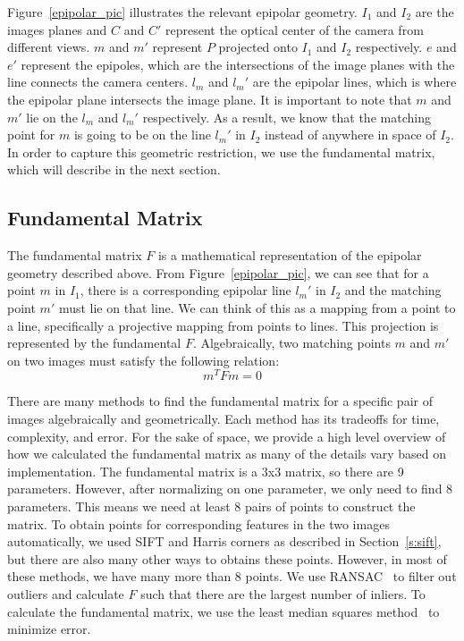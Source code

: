 Figure~\ref{epipolar_pic} illustrates the relevant epipolar geometry. $I_1$ and $I_2$ are the images planes and $C$ and $C'$ represent the optical center of the camera from different views. $m$ and $m'$ represent $P$ projected onto $I_1$ and $I_2$ respectively. $e$ and $e'$ represent the epipoles, which are the intersections of the image planes with the line connects the camera centers. $l_m$ and $l_m'$ are the epipolar lines, which is where the epipolar plane intersects the image plane. It is important to note that $m$ and $m'$ lie on the $l_m$ and $l_m'$ respectively. As a result, we know that the matching point for $m$ is going to be on the line $l_m'$ in $I_2$ instead of anywhere in space of $I_2$. In order to capture this geometric restriction, we use the fundamental matrix, which will describe in the next section.

\subsection{Fundamental Matrix}
The fundamental matrix $F$ is a mathematical representation of the epipolar geometry described above. From Figure~\ref{epipolar_pic}, we can see that for a point $m$ in $I_1$, there is a corresponding epipolar line $l_m'$ in $I_2$ and the matching point $m'$ must lie on that line. We can think of this as a mapping from a point to a line, specifically a projective mapping from points to lines. This projection is represented by the fundamental $F$. Algebraically, two matching points $m$ and $m'$ on two images must satisfy the following relation:
\begin{equation}
m^TFm = 0
\end{equation}

There are many methods to find the fundamental matrix for a specific pair of images algebraically and geometrically. Each method has its tradeoffs for time, complexity, and error. For the sake of space, we provide a high level overview of how we calculated the fundamental matrix as many of the details vary based on implementation. The fundamental matrix is a 3x3 matrix, so there are 9 parameters. However, after normalizing on one parameter, we only need to find 8 parameters. This means we need at least 8 pairs of points to construct the matrix. To obtain points for corresponding features in the two images automatically, we used SIFT and Harris corners as described in Section~\ref{s:sift}, but there are also many other ways to obtains these points. However, in most of these methods, we have many more than 8 points. We use RANSAC~\cite{ransac} to filter out outliers and calculate $F$ such that there are the largest number of inliers. To calculate the fundamental matrix, we use the least median squares method~\cite{lms_zhang} to minimize error. 

